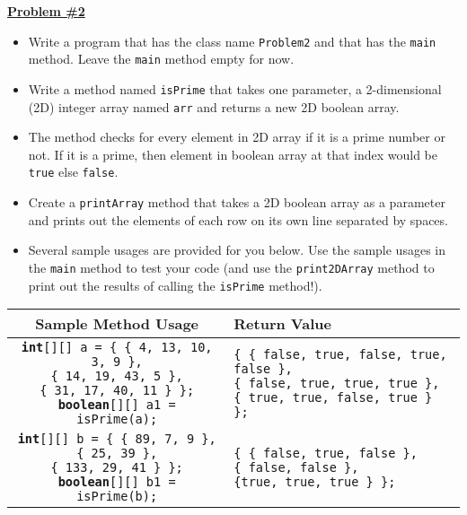 \documentclass[12pt]{article}
\begin{document}
\vspace*{0.5cm}
\noindent\underline{\textbf{Problem \#2}}
\begin{itemize}
	\item Write a program that has the class name \texttt{Problem2} and that has the \texttt{main} method. Leave the \texttt{main} method empty for now.
	\item Write a method named \texttt{isPrime} that takes one parameter, a 2-dimensional (2D) integer array named \texttt{arr} and returns a new 2D boolean array. 
	\item The method checks for every element in 2D array if it is a prime number or not. If it is a prime, then element in boolean array at that index would be \texttt{true} else \texttt{false}.
	\item Create a \texttt{printArray} method that takes a 2D boolean array as a parameter and prints out the elements of each row on its own line separated by spaces.
	\item Several sample usages are provided for you below. Use the sample usages in the \texttt{main} method to test your code (and use the \texttt{print2DArray} method to print out the results of calling the \texttt{isPrime} method!).
\end{itemize}

\noindent\begin{center}
\small
\begin{tabular}{| c | l |}
	\hline\rule{0pt}{4ex}
	Sample Method Usage & Return Value\\
	\hline\rule{0pt}{5ex}
	\makecell[l]{\texttt{\textbf{int}[][] a = \{ \{ 4, 13, 10, 3, 9 \},}\\ \hspace*{2.8cm}\texttt{\{ 14, 19, 43, 5 \},}\\ \hspace*{2.8cm}\texttt{\{ 31, 17, 40, 11 \} \};}\\ \texttt{\textbf{boolean}[][] a1 = isPrime(a);} } & \makecell[l]{\texttt{\{ \{ false, true, false, true, false \},}\\ \hspace*{0.4cm}\texttt{\{ false, true, true, true \},}\\ \hspace*{0.4cm}\texttt{\{ true, true, false, true \} \};} }\\
	\hline\rule{0pt}{5ex}
	\makecell[l]{\texttt{\textbf{int}[][] b = \{ \{ 89, 7, 9 \},}\\ \hspace*{2.8cm}\texttt{\{ 25, 39 \},}\\ \hspace*{2.8cm}\texttt{\{ 133, 29, 41 \} \};}\\ \texttt{\textbf{boolean}[][] b1 = isPrime(b);} } & \makecell[l]{\texttt{\{ \{ false, true, false \},}\\ \hspace*{0.4cm}\texttt{\{ false, false \},}\\ \hspace*{0.4cm}\texttt{\{true, true, true \} \};} }\\
	\hline
\end{tabular}
\end{center}
\end{document}
